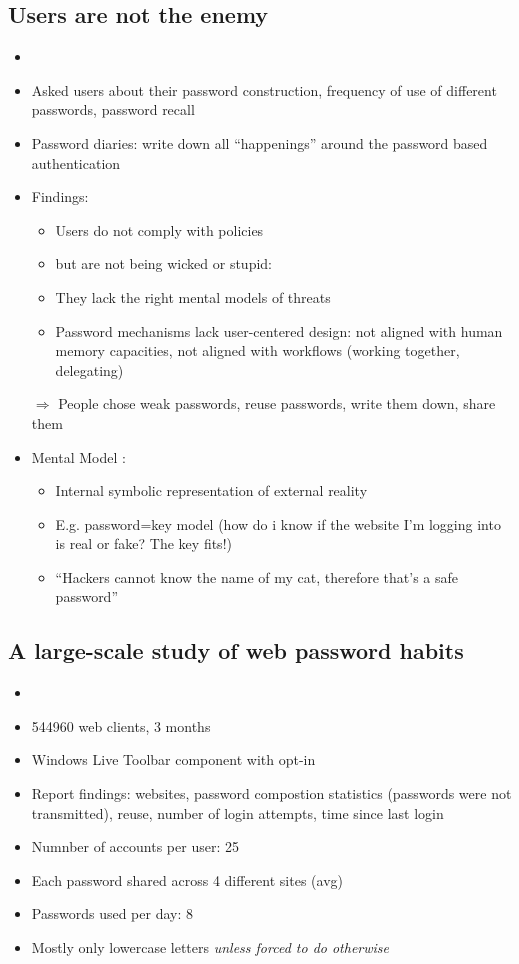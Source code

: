 \documentclass[a4paper]{scrartcl}
\begin{document}
\subsection{Users are not the enemy}
\begin{itemize}
	\item
	\item
		Asked users about their password construction, frequency of use of different passwords, password recall
	\item
		Password diaries: write down all \enquote{happenings} around the password based authentication
	\item
		Findings:
		\begin{itemize}
			\item
				Users do not comply with policies
			\item
				but are not being wicked or stupid:
			\item
				They lack the right mental models of threats
			\item
				Password mechanisms lack user-centered design: not aligned with human memory capacities, not aligned with workflows (working together, delegating)
		\end{itemize}

		$\Rightarrow$ People chose weak passwords, reuse passwords, write them down, share them
	\item
		Mental Model :
		\begin{itemize}
			\item
				Internal symbolic representation of external reality
			\item
				E.g. password=key model (how do i know if the website I'm logging into is real or fake? The key fits!)
			\item
				\enquote{Hackers cannot know the name of my cat, therefore that's a safe password}
		\end{itemize}
\end{itemize}

\subsection{A large-scale study of web password habits}
\begin{itemize}
	\item
	\item
		544960 web clients, 3 months
	\item
		Windows Live Toolbar component with opt-in
	\item
		Report findings: websites, password compostion statistics (passwords were not transmitted), reuse, number of login attempts, time since last login
	\item
		Numnber of accounts per user: 25
	\item
		Each password shared across 4 different sites (avg)
	\item
		Passwords used per day: 8
	\item
		Mostly only lowercase letters \textit{unless forced to do otherwise}
\end{itemize}
\end{document}

